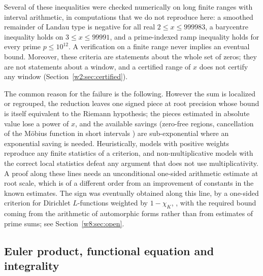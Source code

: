 \documentclass[11pt]{amsart}
\theoremstyle{definition}
\theoremstyle{remark}
\numberwithin{equation}{section}
\begin{document}
Several of these inequalities were checked numerically on long finite ranges with interval arithmetic, in
computations that we do not reproduce here: a smoothed remainder of Landau type is negative for all real
$2\le x\le999983$, a barycentre inequality holds on $3\le x\le99991$, and a prime-indexed ramp inequality
holds for every prime $p\le10^{12}$. A verification on a finite range never implies an eventual bound.
Moreover, these criteria are statements about the whole set of zeros; they are not statements about a window,
and a certified range of $x$ does not certify any window (Section~\ref{w2:sec:certified}).

The common reason for the failure is the following. However the sum is localized or regrouped, the reduction
leaves one signed piece at root precision whose bound is itself equivalent to the Riemann hypothesis; the
pieces estimated in absolute value lose a power of $x$, and the available savings (zero-free regions,
cancellation of the M\"obius function in short intervals \cite{MatomakiRadziwill2016}) are sub-exponential
where an exponential saving is needed. Heuristically, models with positive weights reproduce any finite
statistics of a criterion, and non-multiplicative models with the correct local statistics defeat any argument
that does not use multiplicativity. A proof along these lines needs an unconditional one-sided arithmetic
estimate at root scale, which is of a different order from an improvement of constants in the known
estimates. The sign was eventually obtained along this line, by a one-sided criterion for Dirichlet
$L$-functions weighted by $1-\chi_K$, \cite[Theorem~12.9]{P46}, with the required bound coming from the
arithmetic of automorphic forms rather than from estimates of prime sums; see Section~\ref{w8:sec:open}.

\subsection{Euler product, functional equation and integrality}\label{w7:sec:euler}
\label{w7:fam:R19}
\end{document}
